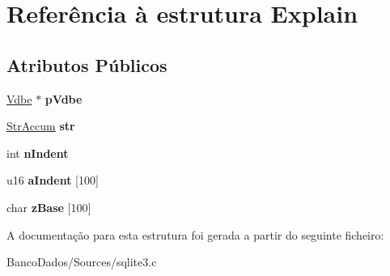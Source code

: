 \hypertarget{struct_explain}{\section{Referência à estrutura Explain}
\label{struct_explain}
}
\subsection*{Atributos Públicos}
\begin{DoxyCompactItemize}
\item 
\hypertarget{struct_explain_a5b40aff5e9132f568c01f5790c69cc89}{\hyperlink{struct_vdbe}{Vdbe} $\ast$ {\bfseries p\-Vdbe}}\label{struct_explain_a5b40aff5e9132f568c01f5790c69cc89}

\item 
\hypertarget{struct_explain_af92c731731b19685b567d29493f1e83e}{\hyperlink{struct_str_accum}{Str\-Accum} {\bfseries str}}\label{struct_explain_af92c731731b19685b567d29493f1e83e}

\item 
\hypertarget{struct_explain_a5420e5a4c88050c6536328612fcad2b7}{int {\bfseries n\-Indent}}\label{struct_explain_a5420e5a4c88050c6536328612fcad2b7}

\item 
\hypertarget{struct_explain_ac80869acc619d982c3246134678b4d6e}{u16 {\bfseries a\-Indent} \mbox{[}100\mbox{]}}\label{struct_explain_ac80869acc619d982c3246134678b4d6e}

\item 
\hypertarget{struct_explain_a1ac782f9829311d6b85edc1707ef8d41}{char {\bfseries z\-Base} \mbox{[}100\mbox{]}}\label{struct_explain_a1ac782f9829311d6b85edc1707ef8d41}

\end{DoxyCompactItemize}


A documentação para esta estrutura foi gerada a partir do seguinte ficheiro\-:\begin{DoxyCompactItemize}
\item 
Banco\-Dados/\-Sources/sqlite3.\-c\end{DoxyCompactItemize}
